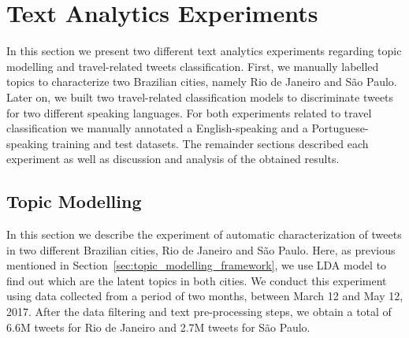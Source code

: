 \chapter{Text Analytics Experiments}
\label{chap:experiments}

\minitoc \mtcskip \noindent

In this section we present two different text analytics experiments regarding topic modelling and travel-related tweets classification. First, we manually labelled topics to characterize two Brazilian cities, namely Rio de Janeiro and São Paulo. Later on, we built two travel-related classification models to discriminate tweets for two different speaking languages. For both experiments related to travel classification we manually annotated a English-speaking and a Portuguese-speaking training and test datasets. The remainder sections described each experiment as well as discussion and analysis of the obtained results.



\section{Topic Modelling}\label{sec:topic_modeling}
In this section we describe the experiment of automatic characterization of tweets in two different Brazilian cities, Rio de Janeiro and São Paulo. Here, as previous mentioned in Section~\ref{sec:topic_modelling_framework}, we use \gls{LDA} model to find out which are the latent topics in both cities.
We conduct this experiment using data collected from a period of two months, between March 12 and May 12, 2017. After the data filtering and text pre-processing steps, we obtain a total of 6.6M tweets for Rio de Janeiro and 2.7M tweets for São Paulo.

